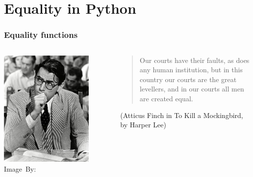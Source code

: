 \section{Equality in Python}
\label{sec:equality_in_python}

\begin{frame}
	\frametitle{Equality functions}

	\begin{columns}
		\begin{center}
			\includegraphics[width=0.8\textwidth]{figures/atticus.jpg}\\
			\hspace*{15pt}\hbox{\scriptsize Image By:}
		\end{center}
		\begin{center}
			\begin{quote}
				Our courts have their faults, as does any human institution, but in this country our courts are the great levellers, and in our courts all men are created equal.
			\end{quote}
			\noindent(Atticus Finch in To Kill a Mockingbird, by Harper Lee)

		\end{center}
	\end{columns}
\end{frame}

